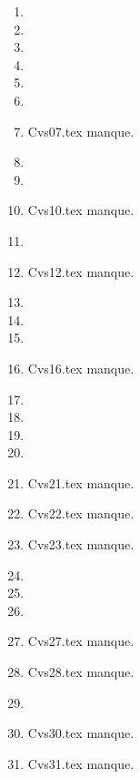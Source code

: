 \begin{enumerate}
  \item  
  \item  
  \item  
  \item  
  \item  
  \item  
  \item Cvs07.tex manque. 
  \item  
  \item  
  \item Cvs10.tex manque. 
  \item  
  \item Cvs12.tex manque. 
  \item  
  \item  
  \item  
  \item Cvs16.tex manque. 
  \item  
  \item  
  \item  
  \item  
  \item Cvs21.tex manque. 
  \item Cvs22.tex manque. 
  \item Cvs23.tex manque. 
  \item  
  \item  
  \item  
  \item Cvs27.tex manque. 
  \item Cvs28.tex manque. 
  \item  
  \item Cvs30.tex manque. 
  \item Cvs31.tex manque. 
\end{enumerate} 
